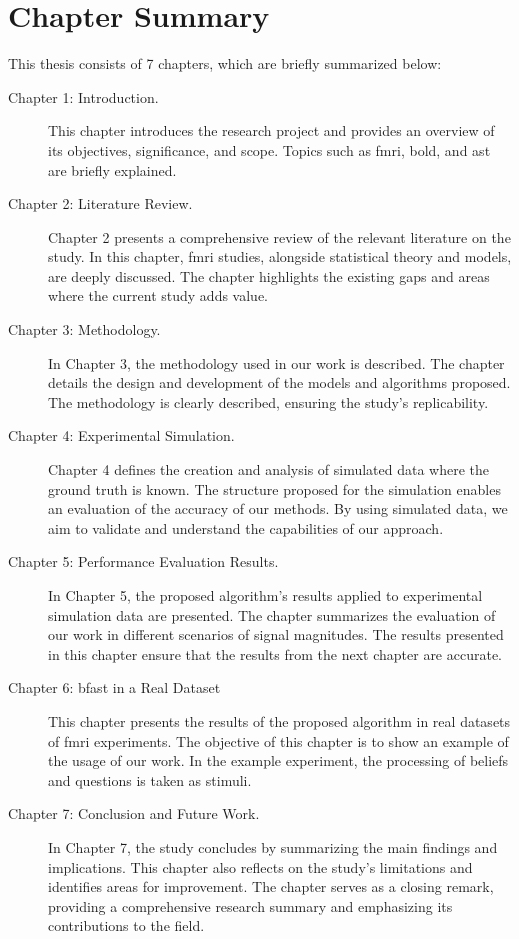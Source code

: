 \section{Chapter Summary}

This thesis consists of 7 chapters, which are briefly summarized below:
\begin{description}
\item [Chapter 1: Introduction.] 
This chapter introduces the research project and provides an overview of its objectives, significance, and scope. Topics such as \gls{fmri}, \gls{bold}, and \gls{ast} are briefly explained.
\item [Chapter 2: Literature Review.]
Chapter 2 presents a comprehensive review of the relevant literature on the study. In this chapter, \gls{fmri} studies, alongside statistical theory and models, are deeply discussed. The chapter highlights the existing gaps and areas where the current study adds value.
\item [Chapter 3: Methodology.]
In Chapter 3, the methodology used in our work is described. The chapter details the design and development of the models and algorithms proposed. The methodology is clearly described, ensuring the study's replicability.
\item [Chapter 4: Experimental Simulation.] 
Chapter 4 defines the creation and analysis of simulated data where the ground truth is known. The structure proposed for the simulation enables an evaluation of the accuracy of our methods. By using simulated data, we aim to validate and understand the capabilities of our approach.
\item [Chapter 5: Performance Evaluation Results.]
In Chapter 5, the proposed algorithm's results applied to experimental simulation data are presented. The chapter summarizes the evaluation of our work in different scenarios of signal magnitudes. The results presented in this chapter ensure that the results from the next chapter are accurate.
\item [Chapter 6: \acrshort{bfast} in a Real Dataset]
This chapter presents the results of the proposed algorithm in real datasets of \gls{fmri} experiments. The objective of this chapter is to show an example of the usage of our work. In the example experiment, the processing of beliefs and questions is taken as stimuli.
\item [Chapter 7: Conclusion and Future Work.]
In Chapter 7, the study concludes by summarizing the main findings and implications. This chapter also reflects on the study's limitations and identifies areas for improvement. The chapter serves as a closing remark, providing a comprehensive research summary and emphasizing its contributions to the field.
\end{description}